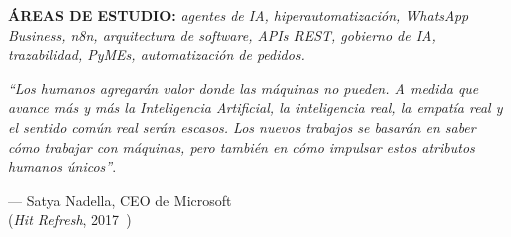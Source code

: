 \begin{flushleft}
    \footnotesize \textbf{ÁREAS DE ESTUDIO:} \textit{agentes de IA, hiperautomatización, WhatsApp Business, n8n, arquitectura de software, APIs REST, gobierno de IA, trazabilidad, PyMEs, automatización de pedidos.}
\end{flushleft}

\begin{abstract}
DeliverAI es un proyecto académico aplicado que busca reducir la fricción entre una consulta comercial por WhatsApp y un pedido confirmado, completo y trazable. El caso se enfoca en PyMEs que reciben pedidos personalizados por chat, donde la información llega en texto libre, imágenes, cambios de último minuto y datos incompletos. La solución propuesta combina un agente conversacional orquestado por n8n, una API transaccional en Spring Boot, una base PostgreSQL y una interfaz administrativa en React. El artículo presenta el problema, el alcance real del MVP técnico, la arquitectura defendible, el valor esperado, los riesgos críticos, la autonomía acotada del agente y los controles necesarios para avanzar a un piloto controlado. La tesis central es prudente: DeliverAI no debe presentarse como producción terminada, sino como un prototipo funcional con evidencia suficiente para validar, con métricas y supervisión humana, si un agente de IA puede mejorar la conversión de conversaciones de WhatsApp a pedidos confirmados.
\end{abstract}

\epigraph{\textit{``Los humanos agregarán valor donde las máquinas no pueden. A medida que avance más y más la Inteligencia Artificial, la inteligencia real, la empatía real y el sentido común real serán escasos. Los nuevos trabajos se basarán en saber cómo trabajar con máquinas, pero también en cómo impulsar estos atributos humanos únicos''}.}{--- Satya Nadella, CEO de Microsoft\\ (\textit{Hit Refresh}, 2017~\cite{nadella2017})} %

